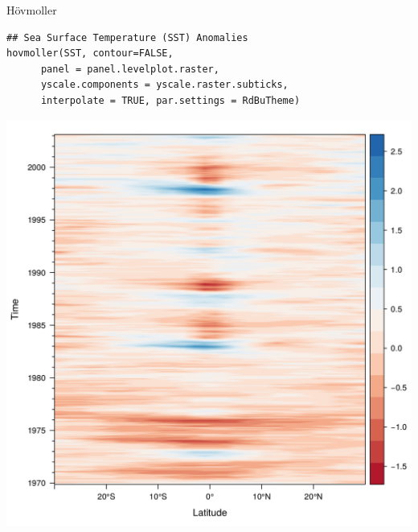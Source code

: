 \documentclass[xcolor={usenames,svgnames,dvipsnames}]{beamer}
\begin{document}
\begin{frame}[fragile,label=sec-16]{Hövmoller}
 \lstset{language=R,numbers=none}
\begin{lstlisting}
## Sea Surface Temperature (SST) Anomalies
hovmoller(SST, contour=FALSE,
	  panel = panel.levelplot.raster,
	  yscale.components = yscale.raster.subticks,
	  interpolate = TRUE, par.settings = RdBuTheme)
\end{lstlisting}

\begin{center}
\includegraphics[height=0.65\textheight]{figs/hovmoller.png}
\end{center}
\end{frame}
\end{document}
